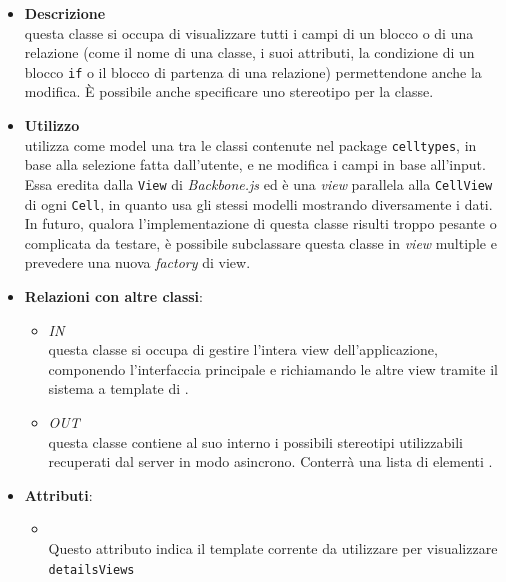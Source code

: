\label{\nogloxy{swedesigner::client::view::DetailsView}}
\begin{itemize}
\item \textbf{Descrizione}\\
questa classe si occupa di visualizzare tutti i campi di un blocco o di una relazione (come il nome di una classe, i suoi attributi, la condizione di un blocco \texttt{if} o il blocco di partenza di una relazione) permettendone anche la modifica. È possibile anche specificare uno stereotipo per la classe.

\item \textbf{Utilizzo}\\
utilizza come model una tra le classi contenute nel package \texttt{celltypes}, in base alla selezione fatta dall'utente, e ne modifica i campi in base all'input. Essa eredita dalla \texttt{View} di \emph{Backbone.js} ed è una \emph{view} parallela alla \texttt{CellView} di ogni \texttt{Cell}, in quanto usa gli stessi modelli mostrando diversamente i dati.
In futuro, qualora l'implementazione di questa classe risulti troppo pesante o complicata da testare, è possibile subclassare questa classe in \emph{view} multiple e prevedere una nuova \emph{factory} di view.
\item \textbf{Relazioni con altre classi}:
\begin{itemize}
\item \textit{IN} \hyperref[\nogloxy{swedesigner::client::view::AppView}]{}\\
questa classe si occupa di gestire l'intera view dell'applicazione, componendo l'interfaccia principale e richiamando le altre view tramite il sistema a template di \backbonejs{}.
\item \textit{OUT} \hyperref[\nogloxy{swedesigner::client::model::utility::ProjectStereotypes}]{}\\
questa classe contiene al suo interno i possibili stereotipi utilizzabili recuperati dal server in modo asincrono. Conterrà una lista di elementi .
\end{itemize}
\item \textbf{Attributi}:
\begin{itemize}
\item {}
\\ Questo attributo indica il template corrente da utilizzare per visualizzare \texttt{detailsViews}

\end{itemize}
\end{itemize}
